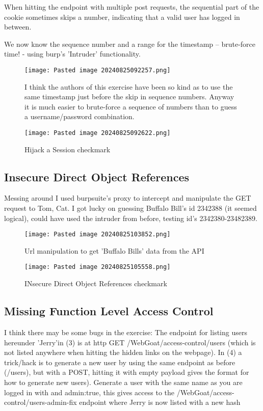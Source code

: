 \documentclass[
	letterpaper, %
	10pt, %
	unnumberedsections, %
	twoside, %
]{APAAssignment}
\begin{document}
\begin{appendices}
When hitting the endpoint with multiple post requests, the sequential part of the cookie sometimes skips a number, indicating that a valid user has logged in between.

We now know the sequence number and a range for the timestamp -- brute-force time! - using burp's 'Intruder' functionality. 


\begin{figure}[!ht]
	\centering
	\texttt{[image: Pasted image 20240825092257.png]}
	\caption{I think the authors of this exercise have been so kind as to use the same timestamp just before the skip in sequence numbers. 
	Anyway it is much easier to brute-force a sequence of numbers than to guess a username/password combination.
	}
	\label{fig:HijackCookieSolved}
\end{figure}

\begin{figure}[!ht] %
	\centering
	\texttt{[image: Pasted image 20240825092622.png]}
	\caption{Hijack a Session checkmark}
	\label{fig:HijackCookieSolvedCheck}
\end{figure}


\subsection{Insecure Direct Object References}
Messing around I used burpsuite's proxy to intercept and manipulate the GET request to Tom, Cat. I got lucky on guessing Buffalo Bill's id 2342388 (it seemed logical), could have used the intruder from before, testing id's 2342380-23482389.   

\begin{figure}[!htb] %
	\texttt{[image: Pasted image 20240825103852.png]}
	\caption{Url manipulation to get 'Buffalo Bills' data from the API}
	\label{fig:BuffaloBillGET}
\end{figure}


\begin{figure}[!htb] %
	\centering
	\texttt{[image: Pasted image 20240825105558.png]}
	\caption{INsecure Direct Object References checkmark}
	\label{fig:InsecureObjectSolvedCheck}
\end{figure}


\subsection{Missing Function Level Access Control}\label{app:MisingFunctionLevelAccessControl}
I think there may be some bugs in the exercise: The endpoint for listing users hereunder 'Jerry'in (3) is at http GET /WebGoat/access-control/users (which is not listed anywhere when hitting the hidden links on the webpage). In (4) a trick/hack is to generate a new user by using the same endpoint as before (/users), but with a POST, hitting it with empty payload {} gives the format for how to generate new users). Generate a user with the same name as you are logged in with and admin:true, this gives access to the  /WebGoat/access-control/users-admin-fix endpoint where Jerry is now listed with a new hash   
   

\end{appendices}
\end{document}
